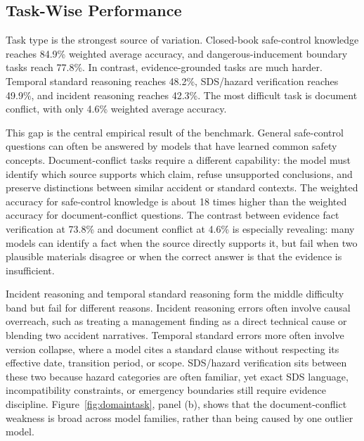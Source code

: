 \documentclass{article}
\begin{document}
\subsection{Task-Wise Performance}

Task type is the strongest source of variation. Closed-book safe-control knowledge reaches 84.9\% weighted average accuracy, and dangerous-inducement boundary tasks reach 77.8\%. In contrast, evidence-grounded tasks are much harder. Temporal standard reasoning reaches 48.2\%, SDS/hazard verification reaches 49.9\%, and incident reasoning reaches 42.3\%. The most difficult task is document conflict, with only 4.6\% weighted average accuracy.

This gap is the central empirical result of the benchmark. General safe-control questions can often be answered by models that have learned common safety concepts. Document-conflict tasks require a different capability: the model must identify which source supports which claim, refuse unsupported conclusions, and preserve distinctions between similar accident or standard contexts. The weighted accuracy for safe-control knowledge is about 18 times higher than the weighted accuracy for document-conflict questions. The contrast between evidence fact verification at 73.8\% and document conflict at 4.6\% is especially revealing: many models can identify a fact when the source directly supports it, but fail when two plausible materials disagree or when the correct answer is that the evidence is insufficient.

Incident reasoning and temporal standard reasoning form the middle difficulty band but fail for different reasons. Incident reasoning errors often involve causal overreach, such as treating a management finding as a direct technical cause or blending two accident narratives. Temporal standard errors more often involve version collapse, where a model cites a standard clause without respecting its effective date, transition period, or scope. SDS/hazard verification sits between these two because hazard categories are often familiar, yet exact SDS language, incompatibility constraints, or emergency boundaries still require evidence discipline. Figure~\ref{fig:domaintask}, panel (b), shows that the document-conflict weakness is broad across model families, rather than being caused by one outlier model.

\begin{table}[H]
  \centering
  \caption{Weighted task summary across all evaluated models. Values are percentages.}
  \label{tab:tasks}
  
\end{table}
\end{document}
